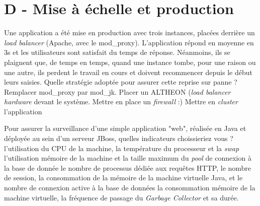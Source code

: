 \documentclass[a4paper,10pt]{article}
\begin{document}
\section{D - Mise à échelle et production}

\begin{question}{Une application a été mise en production avec trois instances, placées derrière un
\textit{load balancer} (Apache, avec le mod\_proxy). L'application répond en moyenne en 3s et les
utilisateurs sont satisfait du temps de réponse. Néanmoins, ils se plaignent que, de temps en temps,
quand une instance tombe, pour une raison ou une autre, ils perdent le travail en cours et doivent
recommencer depuis le début leurs saisies. Quelle stratégie adoptée pour assurer cette reprise sur
panne ?}
  \false Remplacer mod\_proxy par mod\_jk.
  \false Placer un ALTHEON (\textit{load balancer hardware} devant le système.
  \false Mettre en place un \textit{firewall} :)
  \true Mettre en \textit{cluster} l'application
\end{question}

\begin{question}{Pour assurer la surveillance d'une simple application "web", réalisée en Java et
déployée au sein d'un serveur JBoss, quelles indicateurs choissieriez vous ?}
  \false l'utilisation du CPU de la machine, la température du processeur et la \textit{swap}
  \false l'utilisation mémoire de la machine et la taille maximum du \textit{pool} de connexion à la
  base de donnée
  \true le nombre de processus dédiée aux requêtes HTTP, le nombre de session, la consommation de la
  mémoire de la machine virtuelle Java, et le nombre de connexion active à la base de données
  \false la consommation mémoire de la machine virtuelle, la fréquence de passage du \textit{Garbage
  Collector} et sa durée.
\end{question}
\end{document}
